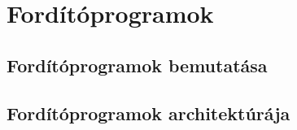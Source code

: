 
\chapter{Fordítóprogramok}

\section{Fordítóprogramok bemutatása}


\section{Fordítóprogramok architektúrája}